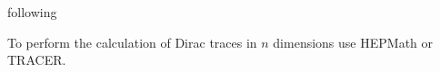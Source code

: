 following \cite{Leader}


To perform the calculation of Dirac traces in $n$ dimensions use HEPMath\cite{wiebusch_hepmath_2015} or TRACER\cite{Tracer}.

